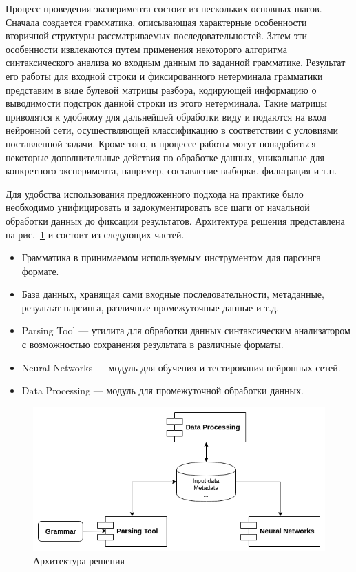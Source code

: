 \documentclass[14pt]{matmex-diploma-custom}
\begin{document}
Процесс проведения эксперимента состоит из нескольких основных шагов. Сначала создается грамматика, описывающая характерные особенности вторичной структуры рассматриваемых последовательностей. Затем эти особенности извлекаются путем применения некоторого алгоритма синтаксического анализа ко входным данным по заданной грамматике. Результат его работы для входной строки и фиксированного нетерминала грамматики представим в виде булевой матрицы разбора, кодирующей информацию о выводимости подстрок данной строки из этого нетерминала. Такие матрицы приводятся к удобному для дальнейшей обработки виду и подаются на вход нейронной сети, осуществляющей классификацию в соответствии с условиями поставленной задачи. Кроме того, в процессе работы могут понадобиться некоторые дополнительные действия по обработке данных, уникальные для конкретного эксперимента, например, составление выборки, фильтрация и т.п.

Для удобства использования предложенного подхода на практике было необходимо унифицировать и задокументировать все шаги от начальной обработки данных до фиксации результатов. Архитектура решения представлена на рис.~\ref{arch} и состоит из следующих частей.
\begin{itemize}
    \item Грамматика в принимаемом используемым инструментом для парсинга формате.
    \item База данных, хранящая сами входные последовательности, метаданные, результат парсинга, различные промежуточные данные и т.д.
    \item Parsing Tool --- утилита для обработки данных синтаксическим анализатором с возможностью сохранения результата в различные форматы.
    \item Neural Networks --- модуль для обучения и тестирования нейронных сетей.
    \item Data Processing --- модуль для промежуточной обработки данных.
\end{itemize}

\begin{figure}[h]
\begin{center}
\centering
\includegraphics[width=14cm]{arch.png}
\caption{Архитектура решения}
\label{arch}
\end{center}
\end{figure}    
\end{document}
